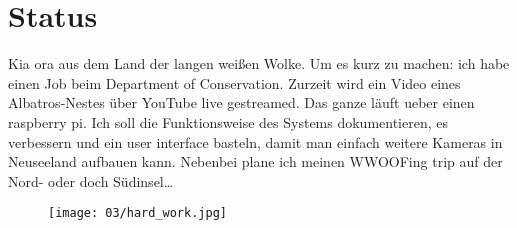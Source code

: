 \chapter{Status}

Kia ora aus dem Land der langen weißen Wolke. Um es kurz zu machen:
ich habe einen Job beim Department of Conservation. Zurzeit wird ein
Video eines Albatros-Nestes \"uber YouTube live gestreamed. Das ganze
l\"auft ueber einen raspberry pi. Ich soll die Funktionsweise des
Systems dokumentieren, es verbessern und ein user interface basteln,
damit man einfach weitere Kameras in Neuseeland aufbauen
kann. Nebenbei plane ich meinen WWOOFing trip auf der Nord- oder doch
S\"udinsel\ldots{}

\begin{figure}[h]
  \centering
  \texttt{[image: 03/hard\_work.jpg]}
\end{figure}
